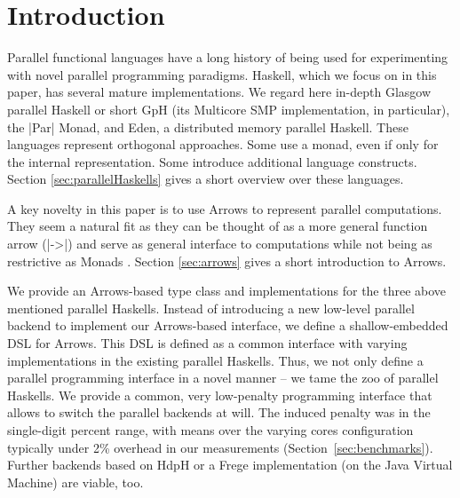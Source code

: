 
\section{Introduction}
\label{sec:introduction}

Parallel functional languages have a long history of being used for experimenting with novel parallel programming paradigms. Haskell, which we focus on in this paper, has  several mature implementations. We regard here in-depth
Glasgow parallel Haskell or short GpH (its Multicore SMP implementation, in particular), the
|Par| Monad, and Eden, a distributed memory parallel Haskell. These
languages represent orthogonal approaches. Some use a monad, even if
only for the internal representation. Some introduce additional
language constructs. Section \ref{sec:parallelHaskells} gives a short overview over these languages.

A key novelty in this paper is to use Arrows to represent parallel computations. They seem a natural fit as they can be thought of as a more general function arrow (|->|) and serve as general interface to computations while not being as restrictive as Monads \citep{HughesArrows}. Section \ref{sec:arrows} gives a short introduction to Arrows.

We provide an Arrows-based type class and implementations for the three above mentioned parallel Haskells.
Instead of 
introducing a new low-level parallel backend to implement our
Arrows-based interface, we define a shallow-embedded DSL for Arrows. This DSL
is defined as a common interface with varying implementations in
the existing parallel Haskells. Thus, we not only define a parallel programming interface in a
novel manner -- we tame the zoo of parallel Haskells. We provide a
common, very low-penalty programming interface that allows to switch
the parallel backends at will. The induced penalty was in the single-digit percent range, with means over the varying cores configuration typically under 2\% overhead in our measurements (Section~\ref{sec:benchmarks}). Further backends based on HdpH or a Frege implementation (on the Java Virtual Machine) are viable, too.

